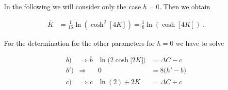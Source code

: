 %
In the following we will consider only the case $h=0$. Then we obtain  

%
\begin{align}\label{eq:ol:K}
\overline K &= \frac{1}{16}\ln(\cosh^{2}[4 K])
= \frac{1}{8}\ln(\cosh[4 K])\;.
\end{align}
%

For the determination for the other parameters for $h=0$ we have to solve

%
\begin{align*}
b)&\Rightarrow \overline{b}& \ln\bigg(2\cosh\big[2 K\big] \bigg) &=
\Delta C -c \tag{$\overline b$}\\
b')&\Rightarrow&0&= 8\big(h' -b \big)\tag{$\overline b'$}\\
c)&\Rightarrow\overline{c}& \ln(2) + 2 \overline K &=\Delta C +c   \tag{$\overline c$}
\end{align*}
%


